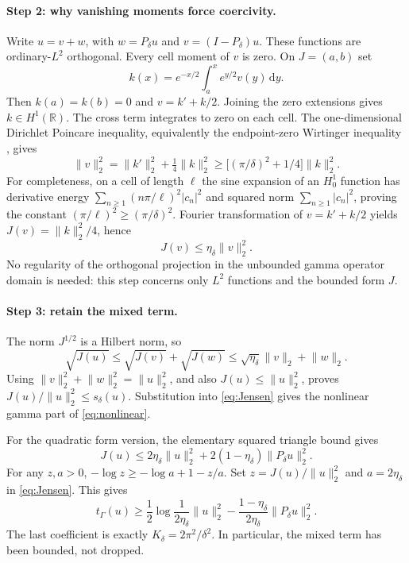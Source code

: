 \documentclass[11pt]{article}
\newcommand{\R}{\mathbb R}
\newcommand{\dd}{\,\mathrm d}
\newcommand{\norm}[1]{\lVert#1\rVert}
\begin{document}
\paragraph{Step 2: why vanishing moments force coercivity.}
Write $u=v+w$, with $w=P_\delta u$ and $v=(I-P_\delta)u$. These functions are ordinary-$L^2$ orthogonal. Every cell moment of $v$ is zero. On $J=(a,b)$ set
\[
 k(x)=e^{-x/2}\int_a^x e^{y/2}v(y)\dd y.
\]
Then $k(a)=k(b)=0$ and $v=k'+k/2$. Joining the zero extensions gives $k\in H^1(\R)$. The cross term integrates to zero on each cell. The one-dimensional Dirichlet Poincare inequality, equivalently the endpoint-zero Wirtinger inequality \cite{HLP}, gives
\[
 \norm v_2^2=\norm{k'}_2^2+\tfrac14\norm k_2^2
 \ge\bigl[(\pi/\delta)^2+1/4\bigr]\norm k_2^2.
\]
For completeness, on a cell of length $\ell$ the sine expansion of an $H_0^1$ function has derivative energy $\sum_{n\ge1}(n\pi/\ell)^2|c_n|^2$ and squared norm $\sum_{n\ge1}|c_n|^2$, proving the constant $(\pi/\ell)^2\ge(\pi/\delta)^2$. Fourier transformation of $v=k'+k/2$ yields $J(v)=\norm k_2^2/4$, hence
\begin{equation}
 J(v)\le\eta_\delta\norm v_2^2.
 \label{eq:kernelJ}
\end{equation}
No regularity of the orthogonal projection in the unbounded gamma operator domain is needed: this step concerns only $L^2$ functions and the bounded form $J$.

\paragraph{Step 3: retain the mixed term.}
The norm $J^{1/2}$ is a Hilbert norm, so
\[
 \sqrt{J(u)}\le\sqrt{J(v)}+\sqrt{J(w)}
 \le\sqrt{\eta_\delta}\norm v_2+\norm w_2.
\]
Using $\norm v_2^2+\norm w_2^2=\norm u_2^2$, and also $J(u)\le\norm u_2^2$, proves
$J(u)/\norm u_2^2\le s_\delta(u)$. Substitution into \eqref{eq:Jensen} gives the nonlinear gamma part of \eqref{eq:nonlinear}.

For the quadratic form version, the elementary squared triangle bound gives
\[
 J(u)\le2\eta_\delta\norm u_2^2
             +2(1-\eta_\delta)\norm{P_\delta u}_2^2.
\]
For any $z,a>0$, $-\log z\ge-\log a+1-z/a$. Set
$z=J(u)/\norm u_2^2$ and $a=2\eta_\delta$ in \eqref{eq:Jensen}. This gives
\[
 t_\Gamma(u)\ge\frac12\log\frac1{2\eta_\delta}\norm u_2^2
 -\frac{1-\eta_\delta}{2\eta_\delta}\norm{P_\delta u}_2^2.
\]
The last coefficient is exactly $K_\delta=2\pi^2/\delta^2$. In particular, the mixed term has been bounded, not dropped.
\end{document}
